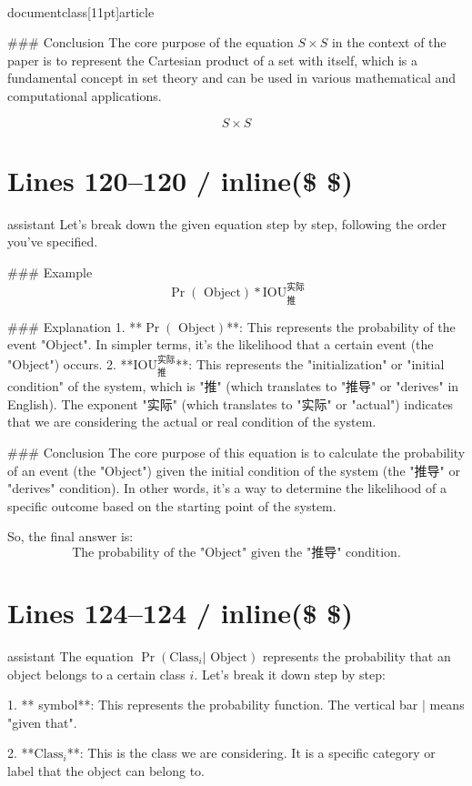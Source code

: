 \\documentclass[11pt]{article}
\begin{document}
### Conclusion
The core purpose of the equation \( S \times S \) in the context of the paper is to represent the Cartesian product of a set with itself, which is a fundamental concept in set theory and can be used in various mathematical and computational applications.

\[
\boxed{S \times S}
\]


\section*{Lines 120–120 / inline(\$ \$) }
assistant
Let's break down the given equation step by step, following the order you've specified.

### Example
\[
\Pr(\textrm{ Object}) * \textrm{IOU}_{\textrm{推}}^{\textrm{实际}}
\]

### Explanation
1. **\(\Pr(\textrm{ Object})\)**: This represents the probability of the event "Object". In simpler terms, it's the likelihood that a certain event (the "Object") occurs.
2. **\(\textrm{IOU}_{\textrm{推}}^{\textrm{实际}}\)**: This represents the "initialization" or "initial condition" of the system, which is "推" (which translates to "推导" or "derives" in English). The exponent "实际" (which translates to "实际" or "actual") indicates that we are considering the actual or real condition of the system.

### Conclusion
The core purpose of this equation is to calculate the probability of an event (the "Object") given the initial condition of the system (the "推导" or "derives" condition). In other words, it's a way to determine the likelihood of a specific outcome based on the starting point of the system.

So, the final answer is:
\[
\boxed{\text{The probability of the "Object" given the "推导" condition.}}
\]


\section*{Lines 124–124 / inline(\$ \$) }
assistant
The equation \(\Pr(\textrm{Class}_i | \textrm{ Object})\) represents the probability that an object belongs to a certain class \(i\). Let's break it down step by step:

1. ** symbol**: This represents the probability function. The vertical bar \(|\) means "given that".

2. **\(\textrm{Class}_i\)**: This is the class we are considering. It is a specific category or label that the object can belong to.
\end{document}
